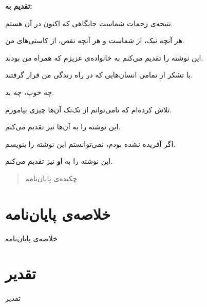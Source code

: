 \documentclass[a4paper,11px]{article}
\begin{document}
{\Large
\textbf{
تقدیم به:
}

\vfill

نتیجه‌ی زحمات شماست جایگاهی که اکنون در آن هستم.

هر آنچه نیک، از شماست و هر آنچه نقص، از کاستی‌های من.

این نوشته را تقدیم می‌کنم به خانواده‌ی عزیزم که همراه من بودند.

\vfill

با تشکر از تمامی انسان‌هایی که در راه زندگی من قرار گرفتند.

چه خوب، چه بد.

تلاش کرده‌ام که تامی‌توانم از تک‌تک آن‌ها چیزی بیاموزم.

این نوشته را به آن‌ها نیز تقدیم می‌کنم.

\vfill


اگر آفریده نشده بودم، نمی‌توانستم این نوشته را بنویسم.

این نوشته را به 
\textbf{
او
} 
نیز تقدیم می‌کنم.


}

\vfill
\newpage


\begin{abstract}
چکیده‌ی پایان‌نامه
\end{abstract}
\newpage

\section*{
خلاصه‌ی پایان‌نامه
}

خلاصه‌ی پایان‌نامه
\newpage

\section*{
تقدیر
}

تقدیر
\newpage


\setcounter{secnumdepth}{2}
\setcounter{tocdepth}{2}
\tableofcontents

\newpage


\listoffigures

\newpage
 
 
\listoftables
\end{document}
